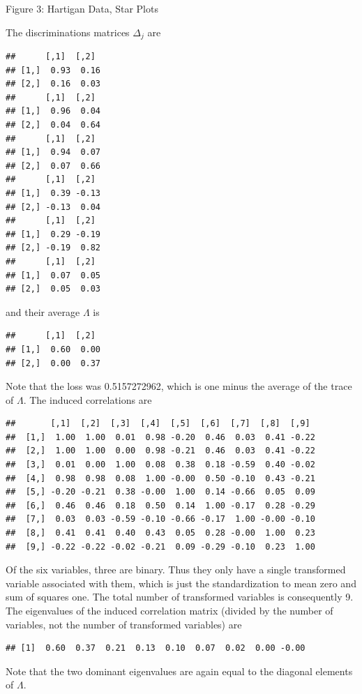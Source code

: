 \documentclass[
  12pt,
]{book}
\begin{document}
Figure 3: Hartigan Data, Star Plots

The discriminations matrices \(\Delta_j\) are

\begin{verbatim}
##      [,1]  [,2] 
## [1,]  0.93  0.16
## [2,]  0.16  0.03
##      [,1]  [,2] 
## [1,]  0.96  0.04
## [2,]  0.04  0.64
##      [,1]  [,2] 
## [1,]  0.94  0.07
## [2,]  0.07  0.66
##      [,1]  [,2] 
## [1,]  0.39 -0.13
## [2,] -0.13  0.04
##      [,1]  [,2] 
## [1,]  0.29 -0.19
## [2,] -0.19  0.82
##      [,1]  [,2] 
## [1,]  0.07  0.05
## [2,]  0.05  0.03
\end{verbatim}

and their average \(\Lambda\) is

\begin{verbatim}
##      [,1]  [,2] 
## [1,]  0.60  0.00
## [2,]  0.00  0.37
\end{verbatim}

Note that the loss was 0.5157272962, which is one minus the average of the trace of \(\Lambda\). The induced correlations are

\begin{verbatim}
##       [,1]  [,2]  [,3]  [,4]  [,5]  [,6]  [,7]  [,8]  [,9] 
##  [1,]  1.00  1.00  0.01  0.98 -0.20  0.46  0.03  0.41 -0.22
##  [2,]  1.00  1.00  0.00  0.98 -0.21  0.46  0.03  0.41 -0.22
##  [3,]  0.01  0.00  1.00  0.08  0.38  0.18 -0.59  0.40 -0.02
##  [4,]  0.98  0.98  0.08  1.00 -0.00  0.50 -0.10  0.43 -0.21
##  [5,] -0.20 -0.21  0.38 -0.00  1.00  0.14 -0.66  0.05  0.09
##  [6,]  0.46  0.46  0.18  0.50  0.14  1.00 -0.17  0.28 -0.29
##  [7,]  0.03  0.03 -0.59 -0.10 -0.66 -0.17  1.00 -0.00 -0.10
##  [8,]  0.41  0.41  0.40  0.43  0.05  0.28 -0.00  1.00  0.23
##  [9,] -0.22 -0.22 -0.02 -0.21  0.09 -0.29 -0.10  0.23  1.00
\end{verbatim}

Of the six variables, three are binary. Thus they only have a single transformed variable associated with them, which is just the standardization to mean zero and sum of squares one. The total number of transformed variables is consequently 9. The eigenvalues of the
induced correlation matrix (divided by the number of variables, not the number of transformed variables) are

\begin{verbatim}
## [1]  0.60  0.37  0.21  0.13  0.10  0.07  0.02  0.00 -0.00
\end{verbatim}

Note that the two dominant eigenvalues are again equal to the diagonal elements of \(\Lambda\).
\end{document}
